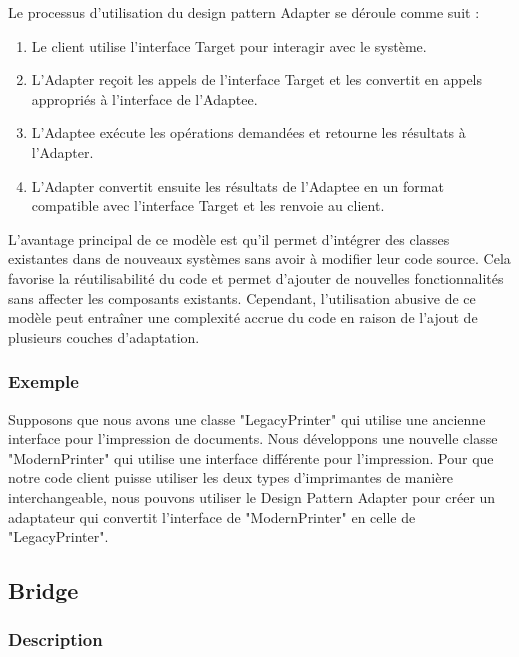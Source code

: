 Le processus d'utilisation du design pattern Adapter se déroule comme suit :

\begin{enumerate}[leftmargin=*,labelsep=3mm]
    \item Le client utilise l'interface Target pour interagir avec le système.
    \item L'Adapter reçoit les appels de l'interface Target et les convertit en appels appropriés à l'interface de l'Adaptee.
    \item L'Adaptee exécute les opérations demandées et retourne les résultats à l'Adapter.
    \item L'Adapter convertit ensuite les résultats de l'Adaptee en un format compatible avec l'interface Target et les renvoie au client.
\end{enumerate}

L'avantage principal de ce modèle est qu'il permet d'intégrer des classes existantes dans de nouveaux systèmes sans avoir à modifier leur code source. Cela favorise la réutilisabilité du code et permet d'ajouter de nouvelles fonctionnalités sans affecter les composants existants. Cependant, l'utilisation abusive de ce modèle peut entraîner une complexité accrue du code en raison de l'ajout de plusieurs couches d'adaptation.


\subsubsection{Exemple}

Supposons que nous avons une classe "LegacyPrinter" qui utilise une ancienne interface pour l'impression de documents. Nous développons une nouvelle classe "ModernPrinter" qui utilise une interface différente pour l'impression. Pour que notre code client puisse utiliser les deux types d'imprimantes de manière interchangeable, nous pouvons utiliser le Design Pattern Adapter pour créer un adaptateur qui convertit l'interface de "ModernPrinter" en celle de "LegacyPrinter".




\newpage

\subsection{Bridge}

\subsubsection{Description}

